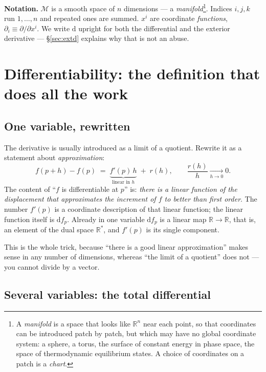 \documentclass[10pt,a4paper]{article}
\newcommand{\dd}{\mathrm{d}}
\newcommand{\R}{\mathbb{R}}
\newcommand{\M}{\mathcal{M}}
\theoremstyle{plain}
\theoremstyle{definition}
\numberwithin{equation}{section}
\begin{document}
\bigskip
\noindent\textbf{Notation.} $\M$ is a smooth space of $n$ dimensions --- a
\emph{manifold}\footnote{A \emph{manifold} is a space that looks like $\R^n$ near each point,
so that coordinates can be introduced patch by patch, but which may have no global coordinate
system: a sphere, a torus, the surface of constant energy in phase space, the space of
thermodynamic equilibrium states. A choice of coordinates on a patch is a \emph{chart}.}. Indices
$i,j,k$ run $1,\dots,n$ and repeated ones are summed. $x^i$ are coordinate \emph{functions},
$\partial_i\equiv\partial/\partial x^i$. We write $\dd$ upright for both the differential and
the exterior derivative --- \S\ref{sec:extd} explains why that is not an abuse.

\section{Differentiability: the definition that does all the work}
\label{sec:diffable}

\subsection{One variable, rewritten}

The derivative is usually introduced as a limit of a quotient. Rewrite it as a statement about
\emph{approximation}:
\begin{equation}
f(p+h)-f(p) \;=\; \underbrace{f'(p)\,h}_{\text{linear in }h} \;+\; r(h),
\qquad \frac{r(h)}{h}\xrightarrow[h\to0]{}0 .
\label{eq:1dlin}
\end{equation}
The content of ``$f$ is differentiable at $p$'' is: \emph{there is a linear function of the
displacement that approximates the increment of $f$ to better than first order}. The number
$f'(p)$ is a coordinate description of that linear function; the linear function itself is
$\dd f_p$. Already in one variable $\dd f_p$ is a linear map $\R\to\R$, that is, an element of
the dual space $\R^*$, and $f'(p)$ is its single component.

This is the whole trick, because ``there is a good linear approximation'' makes sense in any
number of dimensions, whereas ``the limit of a quotient'' does not --- you cannot divide by a
vector.

\subsection{Several variables: the total differential}
\end{document}
